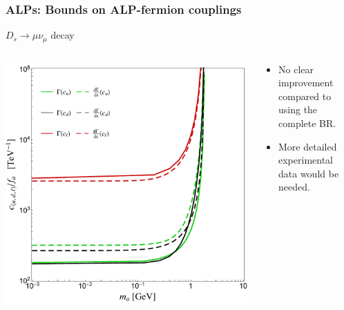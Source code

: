 \documentclass[mathserif, 10pt]{beamer}
\begin{document}
\begin{frame}\frametitle{ALPs: Bounds on ALP-fermion couplings}
    $D_s \to \mu \nu_\mu$ decay
    \begin{columns}
        \begin{column}{0.5\textwidth}
            \includegraphics[width=\columnwidth]{figures/Fig3bSpro}
        \end{column}
        \begin{column}{0.5\textwidth}
            \begin{itemize}
                \item No clear improvement compared to using the complete BR.
                \item More detailed experimental data would be needed.

            \end{itemize}
        \end{column}
    \end{columns}
\end{frame}
\end{document}
